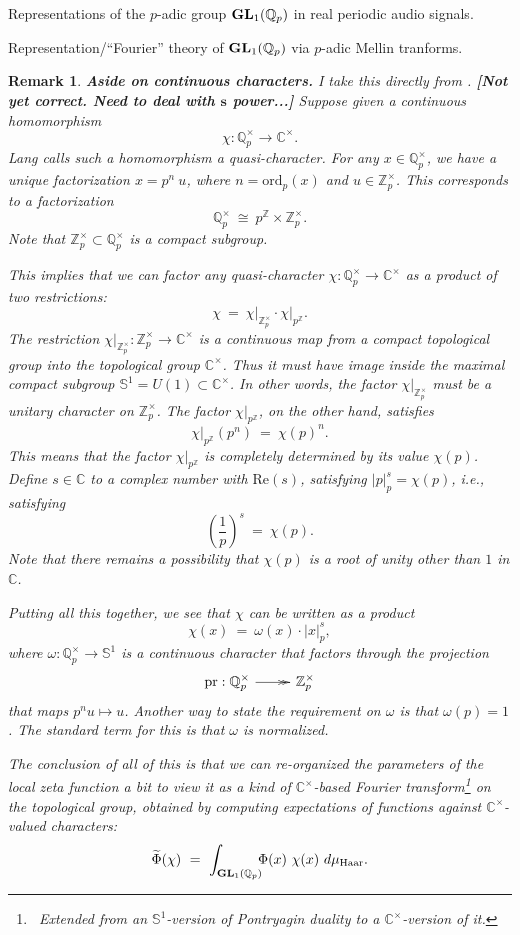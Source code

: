 \documentclass[letterpaper,11pt, reqno]{amsart}
\makeatletter
\newtheorem{monodromy theorem}{Monodromy Theorem}[subsection]
\newtheorem{wild conjecture}[theorem]{Wild Conjecture}
\newtheorem{research objectives}{Research objectives}[subsection]
\newtheorem{research question}[theorem]{Research questions}
\newtheorem{aside question}[theorem]{Aside question}
\newtheorem{audio example}[theorem]{\loudspeaker[3] Example}
\newtheorem{blank remark}[theorem]{}
\newtheorem{terminology and comment}[theorem]{Terminology and comment}
\newtheorem{purity hypothesis}[theorem]{Purity hypothesis}
\newtheorem{corollary of the purity hypothesis}[theorem]{Corollary of the purity hypothesis}
\newtheorem{rem1}[theorem]{Remark}
\newenvironment{remark}{\begin{rem1}\em}{\end{rem1}}
\newcommand{\CC} {{\mathbb C}}
\newcommand{\QQ} {{\mathbb Q}}
\newcommand{\ZZ} {{\mathbb Z}}
\newcommand{\lra}{{\longrightarrow}}
\newcommand{\epi}{\!\xymatrix{{}\ar@{->>}[r]&{}}\!}
\numberwithin{equation}{theorem}
\makeatother
\begin{document}
\begin{section}{Representations of the $p$-adic group $\bold{GL}_{1}(\mathbb{Q}_{p})$
in real periodic audio signals.}
\begin{subsection}{Representation/``Fourier'' theory of $\bold{GL}_{1}(\QQ_p)$ via $p$-adic Mellin tranforms.}
\begin{remark}{{\bf Aside on continuous characters.}} I take this directly from \cite[\S VII.2]{Lang}.
{\bf\color{red} [Not yet correct. Need to deal with $\pmb{s}$ power...]}
Suppose given a continuous homomorphism
	$$
	\chi:\QQ^{\times}_{p}\lra\CC^\times.
	$$
Lang calls such a homomorphism a {\em quasi-character}.
For any $x\in\QQ^\times_p$, we have a {\em unique} factorization $x=p^n\ u$, where $n=\text{ord}_{p}(x)$ and $u\in\ZZ^\times_p$. This corresponds to a factorization
	$$
	\QQ^\times_{p}
	\ \cong\ 
	p^{\ZZ}\times\ZZ^\times_p.
	$$
Note that $\ZZ^\times_p\subset\QQ^\times_p$ is a compact subgroup.

	This implies that we can factor any quasi-character $\chi:\QQ^{\times}_p\lra\CC^\times$ as a product of two restrictions:
	$$
	\chi
	\ =\ 
	\left.\chi\right|_{\ZZ^\times_p}
	\cdot
	\left.\chi\right|_{p^\ZZ}.
	$$
The restriction $\left.\chi\right|_{\ZZ^\times_p}:\ZZ^\times_p\lra\CC^\times$ is a continuous map from a compact topological group into the topological group $\CC^\times$. Thus it must have image inside the maximal compact subgroup $\mathbb{S}^1=U(1)\subset\CC^\times$. In other words, {\em the factor $\left.\chi\right|_{\ZZ^\times_p}$ must be a unitary character on $\ZZ^\times_p$}. The factor $\left.\chi\right|_{p^\ZZ}$, on the other hand, satisfies
	$$
	\left.\chi\right|_{p^\ZZ\!\!}(p^n)\ =\ \chi(p)^n.
	$$
This means that the factor $\left.\chi\right|_{p^\ZZ}$ is completely determined by its value $\chi(p)$. Define $s\in\CC$ to a complex number with $\text{Re}(s)$, satisfying $|p|^{s}_{p}=\chi(p)$, i.e., satisfying
	$$
	\left(\frac{1}{p}\right)^{\!\!s}\ =\ \chi(p).
	$$
Note that there remains a possibility that $\chi(p)$ is a root of unity other than $1$ in $\CC$.

Putting all this together, we see that $\chi$ can be written as a product
	$$
	\chi(x)
	\ =\ 
	\omega(x)\cdot|x|^{s}_{p},
	$$
where $\omega:\QQ^{\times}_p\lra\mathbb{S}^1$ is a continuous character that factors through the projection
	$$
	\text{pr}:\QQ^\times_p\epi\ZZ^\times_p
	$$
that maps $p^nu\mapsto u$. Another way to state the requirement on $\omega$ is that $\omega(p)=1$. The standard term for this is that $\omega$ is {\em normalized}.

	The conclusion of all of this is that we can re-organized the parameters of the local zeta function a bit to view it as a kind of $\CC^\times$-based Fourier transform\footnote{\ Extended from an $\mathbb{S}^1$-version of Pontryagin duality to a $\CC^\times$-version of it.} on the topological group, obtained by computing expectations of functions against $\CC^\times$-valued characters:
	\begin{equation}\label{Mellin as Fourier}
	\widetilde{\Phi}(\chi)
	\ =\ 
	\int_{\bold{GL}_{1}(\QQ_p)}\!\!\!\Phi(x)\ \chi(x)\ d\mu_{\text{Haar}}.
	\end{equation}
\end{remark}


\end{subsection}
\end{section}
\end{document}
